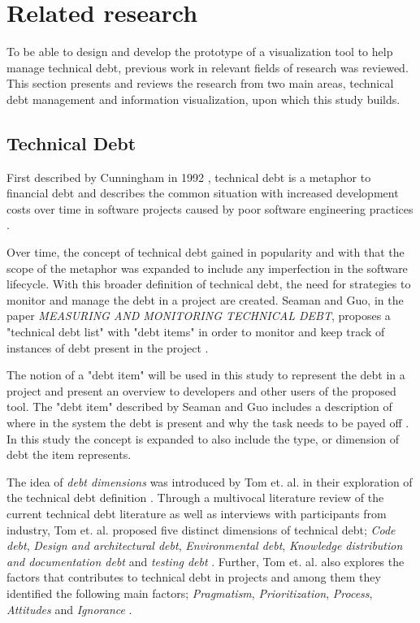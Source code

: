 \section{Related research}
To be able to design and develop the prototype of a visualization tool to help manage technical debt, previous work in relevant fields of research was reviewed.
This section presents and reviews the research from two main areas, technical debt management and information visualization, upon which this study builds.

\subsection{Technical Debt}
First described by Cunningham in 1992 \cite{cunningham_wycash_1992}, technical debt is a metaphor to financial debt and describes the common situation with increased development costs over time in software projects caused by poor software engineering practices \cite{tom_exploration_2013}.

Over time, the concept of technical debt gained in popularity and with that the scope of the metaphor was expanded to include any imperfection in the software lifecycle.
With this broader definition of technical debt, the need for strategies to monitor and manage the debt in a project are created.
Seaman and Guo, in the paper \textit{MEASURING AND MONITORING TECHNICAL DEBT}, proposes a "technical debt list" with "debt items" in order to monitor and keep track of instances of debt present in the project \cite{seaman_measuring_2011}.

The notion of a "debt item" will be used in this study to represent the debt in a project and present an overview to developers and other users of the proposed tool.
The "debt item" described by Seaman and Guo includes a description of where in the system the debt is present and why the task needs to be payed off \cite{seaman_measuring_2011}.
In this study the concept is expanded to also include the type, or dimension of debt the item represents.

The idea of \textit{debt dimensions} was introduced by Tom et. al. in their exploration of the technical debt definition \cite{tom_exploration_2013}.
Through a multivocal literature review of the current technical debt literature as well as interviews with participants from industry, Tom et. al. proposed five distinct dimensions of technical debt; \textit{Code debt}, \textit{Design and architectural debt}, \textit{Environmental debt}, \textit{Knowledge distribution and documentation debt} and \textit{testing debt} \cite{tom_exploration_2013}.
Further, Tom et. al. also explores the factors that contributes to technical debt in projects and among them they identified the following main factors; \textit{Pragmatism}, \textit{Prioritization}, \textit{Process}, \textit{Attitudes} and \textit{Ignorance} \cite{tom_exploration_2013}.

